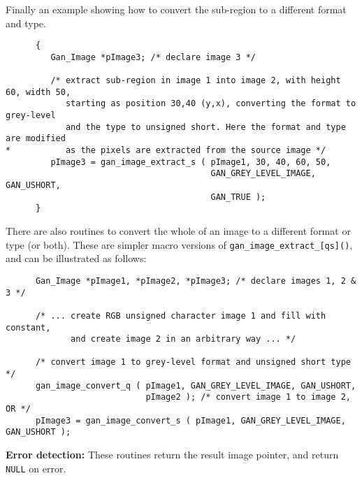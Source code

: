 Finally an example showing how to convert the sub-region to a different
format and type.
\begin{verbatim}
      {
         Gan_Image *pImage3; /* declare image 3 */

         /* extract sub-region in image 1 into image 2, with height 60, width 50,
            starting as position 30,40 (y,x), converting the format to grey-level
            and the type to unsigned short. Here the format and type are modified
*           as the pixels are extracted from the source image */
         pImage3 = gan_image_extract_s ( pImage1, 30, 40, 60, 50,
                                         GAN_GREY_LEVEL_IMAGE, GAN_USHORT,
                                         GAN_TRUE );
      }
\end{verbatim}

There are also routines to convert the whole of an image to a different
format or type (or both). These are simpler macro versions of
{\tt gan\_image\_extract\_[qs]()}, and can be illustrated as follows:
\begin{verbatim}
      Gan_Image *pImage1, *pImage2, *pImage3; /* declare images 1, 2 & 3 */

      /* ... create RGB unsigned character image 1 and fill with constant,
             and create image 2 in an arbitrary way ... */

      /* convert image 1 to grey-level format and unsigned short type */
      gan_image_convert_q ( pImage1, GAN_GREY_LEVEL_IMAGE, GAN_USHORT,
                            pImage2 ); /* convert image 1 to image 2, OR */
      pImage3 = gan_image_convert_s ( pImage1, GAN_GREY_LEVEL_IMAGE, GAN_USHORT );
\end{verbatim}

{\bf Error detection:} These routines return the result image pointer,
and return {\tt NULL} on error.

